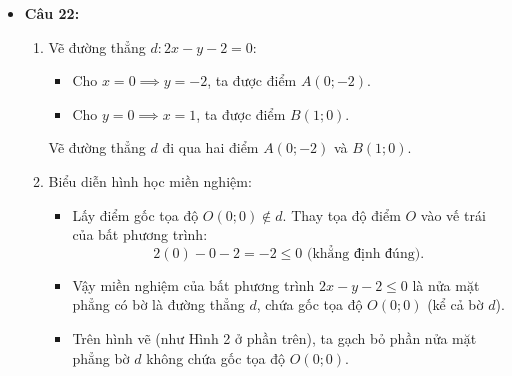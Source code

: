 \documentclass[12pt,a4paper]{article}
\begin{document}
\begin{itemize}[leftmargin=0.6cm, itemsep=4pt]
    \item \textbf{Câu 22:}
    \begin{enumerate}
        \item Vẽ đường thẳng $d: 2x - y - 2 = 0$:
        \begin{itemize}
            \item Cho $x = 0 \implies y = -2$, ta được điểm $A(0; -2)$.
            \item Cho $y = 0 \implies x = 1$, ta được điểm $B(1; 0)$.
        \end{itemize}
        Vẽ đường thẳng $d$ đi qua hai điểm $A(0; -2)$ và $B(1; 0)$.
        \item Biểu diễn hình học miền nghiệm:
        \begin{itemize}
            \item Lấy điểm gốc tọa độ $O(0; 0) \notin d$. Thay tọa độ điểm $O$ vào vế trái của bất phương trình:
            \[
            2(0) - 0 - 2 = -2 \le 0\text{ (khẳng định đúng)}.
            \]
            \item Vậy miền nghiệm của bất phương trình $2x - y - 2 \le 0$ là nửa mặt phẳng có bờ là đường thẳng $d$, chứa gốc tọa độ $O(0; 0)$ (kể cả bờ $d$).
            \item Trên hình vẽ (như Hình 2 ở phần trên), ta gạch bỏ phần nửa mặt phẳng bờ $d$ không chứa gốc tọa độ $O(0; 0)$.
        \end{itemize}
    \end{enumerate}
\end{itemize}
\end{document}

